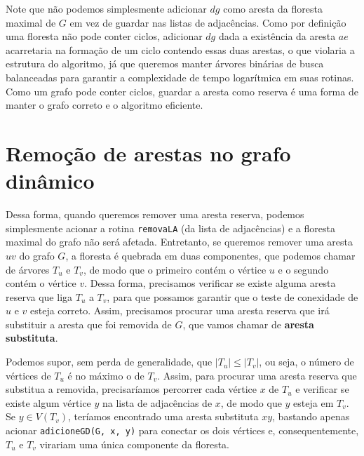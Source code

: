 Note que não podemos simplesmente adicionar $dg$ como aresta da floresta maximal de $G$ em vez de guardar nas listas de adjacências. Como por definição uma floresta não pode conter ciclos, adicionar $dg$ dada a existência da aresta $ae$ acarretaria na formação de um ciclo contendo essas duas arestas, o que violaria a estrutura do algoritmo, já que queremos manter árvores binárias de busca balanceadas para garantir a complexidade de tempo logarítmica em suas rotinas. Como um grafo pode conter ciclos, guardar a aresta como reserva é uma forma de manter o grafo correto e o algoritmo eficiente. 

\section{Remoção de arestas no grafo dinâmico}

Dessa forma, quando queremos remover uma aresta reserva, podemos simplesmente acionar a rotina \texttt{removaLA} (da lista de adjacências) e a floresta maximal do grafo não será afetada. Entretanto, se queremos remover uma aresta $uv$ do grafo $G$, a floresta é quebrada em duas componentes, que podemos chamar de árvores $T_u$ e $T_v$, de modo que o primeiro contém o vértice $u$ e o segundo contém o vértice $v$. Dessa forma, precisamos verificar se existe alguma aresta reserva que liga $T_u$ a $T_v$, para que possamos garantir que o teste de conexidade de $u$ e $v$ esteja correto. Assim, precisamos procurar uma aresta reserva que irá substituir a aresta que foi removida de $G$, que vamos chamar de \textbf{aresta substituta}.

Podemos supor, sem perda de generalidade, que $|T_u| \leq |T_v|$, ou seja, o número de vértices de $T_u$ é no máximo o de $T_v$. Assim, para procurar uma aresta reserva que substitua a removida, precisaríamos percorrer cada vértice $x$ de $T_u$ e verificar se existe algum vértice $y$ na lista de adjacências de $x$, de modo que $y$ esteja em $T_v$. Se $y \in V(T_v)$, teríamos encontrado uma aresta substituta $xy$, bastando apenas acionar \texttt{adicioneGD(G, x, y)} para conectar os dois vértices e, consequentemente, $T_u$ e $T_v$ virariam uma única componente da floresta.

